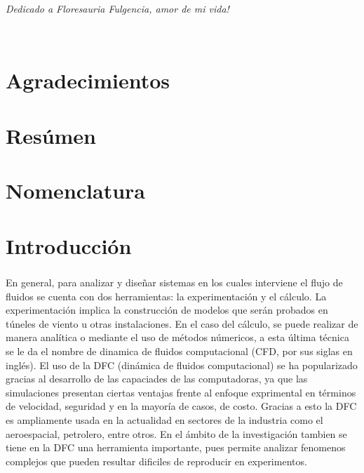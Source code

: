 \documentclass[letterpaper, openright, 12pt]{book}
\begin{document}
	\newpage
	\begin{flushright}
		\textit{Dedicado a Floresauria Fulgencia, amor de mi vida!}
	\end{flushright}
	\ %
	
	\chapter*{Agradecimientos}
	
	\chapter*{Resúmen}
	
	\tableofcontents
	
	\cleardoublepage
	\listoffigures
	
	
	\cleardoublepage
	\listoftables
	\cleardoublepage
	
	\chapter*{Nomenclatura}
	
	\chapter*{Introducción}
	\paragraph*{}
		En general, para analizar y diseñar sistemas en los cuales interviene el flujo de fluidos se cuenta con dos herramientas: la experimentación y el cálculo. La experimentación implica la construcción de modelos que serán probados en túneles de viento u otras instalaciones. En el caso del cálculo, se puede realizar de manera analítica o mediante el uso de métodos númericos, a esta última técnica se le da el nombre de dinamica de fluidos computacional (CFD, por sus siglas en inglés). El uso de la DFC (dinámica de fluidos computacional) se ha popularizado gracias al desarrollo de las capaciades de las computadoras, ya que las simulaciones presentan ciertas ventajas frente al enfoque exprimental en términos de velocidad, seguridad y en la mayoría de casos, de costo. Gracias a esto la DFC es ampliamente usada en la actualidad en sectores de la industria como el aeroespacial, petrolero, entre otros. En el ámbito de la investigación tambien se tiene en la DFC una herramienta importante, pues permite analizar fenomenos complejos que pueden resultar dificiles de reproducir en experimentos.
	
\end{document}
